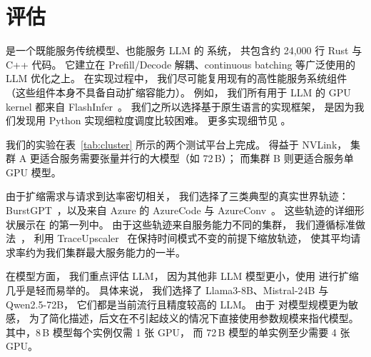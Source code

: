 \section{评估}
\label{sec:eval}

{\sys} 是一个既能服务传统模型、也能服务 LLM 的 {\maas} 系统，
共包含约 24,000 行 Rust 与 C++ 代码。
它建立在 Prefill/Decode 解耦、continuous batching 等广泛使用的 LLM 优化之上。
在实现过程中，
我们尽可能复用现有的高性能服务系统组件（这些组件本身不具备自动扩缩容能力）。
例如，
我们所有用于 LLM 的 GPU kernel 都来自 FlashInfer~\cite{flashinfer}。
我们之所以选择基于原生语言的实现框架，
是因为我们发现用 Python 实现细粒度调度比较困难。
更多实现细节见 \textsection{\ref{sec:appendix}}。



我们的实验在表~\ref{tab:cluster} 所示的两个测试平台上完成。
得益于 NVLink，
集群 A 更适合服务需要张量并行的大模型（如 72\,B）；
而集群 B 则更适合服务单 GPU 模型。

由于扩缩需求与请求到达率密切相关，
我们选择了三类典型的真实世界轨迹：
BurstGPT~\cite{wang2024burstgpt}，以及来自 Azure 的 AzureCode 与 AzureConv~\cite{DBLP:conf/isca/PatelCZSGMB24}。
这些轨迹的详细形状展示在 {} 的第一列中。
由于这些轨迹来自服务能力不同的集群，
我们遵循标准做法~\cite{DBLP:conf/asplos/MiaoSDXL0J24,DBLP:journals/pvldb/AliPYS22,DBLP:conf/osdi/GujaratiKAHKVM20}，
利用 TraceUpscaler~\cite{traceupscaler} 在保持时间模式不变的前提下缩放轨迹，
使其平均请求率约为我们集群最大服务能力的一半。

在模型方面，
我们重点评估 LLM，
因为其他非 LLM 模型更小，使用 {\sys} 进行扩缩几乎是轻而易举的。
具体来说，
我们选择了 Llama3-8B、Mistral-24B 与 Qwen2.5-72B，
它们都是当前流行且精度较高的 LLM。
由于 {\sys} 对模型规模更为敏感，
为了简化描述，后文在不引起歧义的情况下直接使用参数规模来指代模型。
其中，8\,B 模型每个实例仅需 1 张 GPU，
而 72\,B 模型的单实例至少需要 4 张 GPU。

